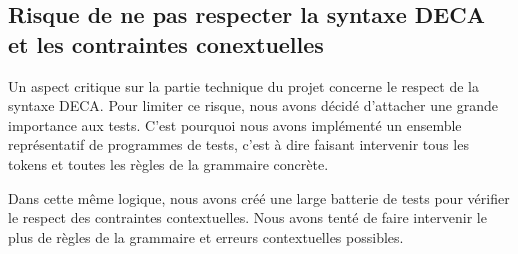 \documentclass[12pt, a4paper, one side]{article}
\begin{document}
\subsection{Risque de ne pas respecter la syntaxe DECA et les contraintes conextuelles}
\begin{flushleft}
Un aspect critique sur la partie technique du projet concerne le respect de la syntaxe DECA. Pour limiter ce risque, nous avons décidé d'attacher une grande importance aux tests. C'est pourquoi nous avons implémenté un ensemble représentatif de programmes de tests, c'est à dire faisant intervenir tous les tokens et toutes les règles de la grammaire concrète.
\end{flushleft}
\begin{flushleft}
Dans cette même logique, nous avons créé une large batterie de tests pour vérifier le respect des contraintes contextuelles. Nous avons tenté de faire intervenir le plus de règles de la grammaire et erreurs contextuelles possibles.
\end{flushleft}
\end{document}
